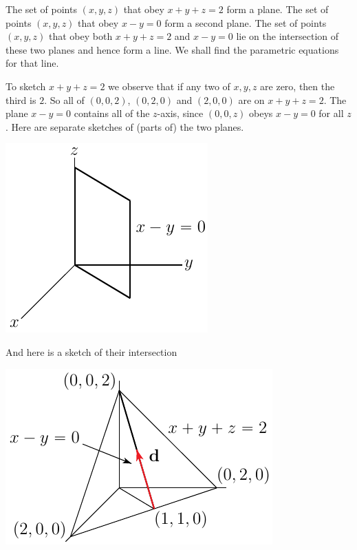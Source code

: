 \begin{eg}\label{eg line equations}
The set of points $(x,y,z)$ that obey $x+y+z=2$ form a
plane. The set of points $(x,y,z)$ that obey $x-y=0$ form a second plane. 
 The set of points $(x,y,z)$ that obey both $x+y+z=2$ and $x-y=0$  lie
on the intersection of these two planes and hence form a line. We shall
find the parametric equations for that line. 

To sketch $x+y+z=2$ we observe
that if any two of $x,y,z$ are zero, then the third is $2$. So all of $(0,0,2)$,
$(0,2,0)$ and $(2,0,0)$ are on $x+y+z=2$. The plane $x-y=0$ contains all
of the $z$-axis, since $(0,0,z)$ obeys $x-y=0$ for all $z$.
Here are separate sketches of (parts of) the two planes.
      \begin{efig} 
      \begin{center}
      \qquad
      \includegraphics{planeIntB}
      \end{center}
      \end{efig}
And here is a sketch of their intersection
      \begin{efig} 
      \begin{center}
      \includegraphics{planeInt}

\end{center}
\end{efig}
\end{eg}
